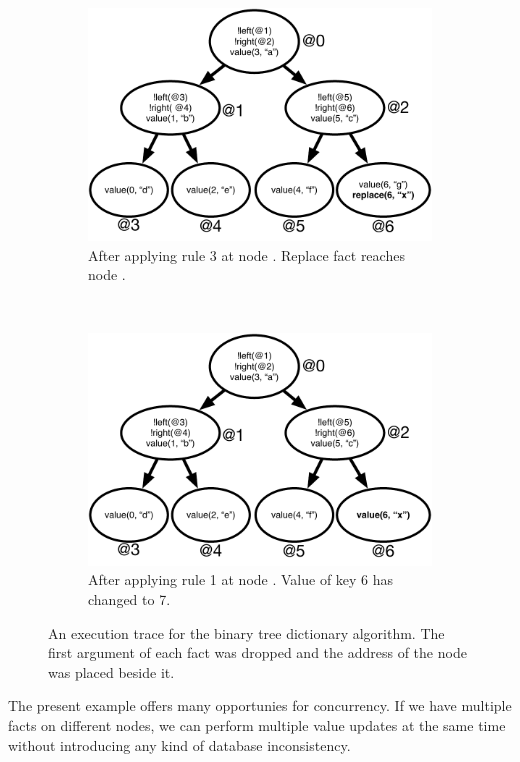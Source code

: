 \begin{figure}[h]
        \begin{subfigure}[b]{0.5\textwidth}
                \includegraphics[width=\textwidth]{figures/btree/btree_trace3}
                \caption{After applying rule 3 at node . Replace fact
                   reaches node .}
                \label{fig:btree_trace3}
        \end{subfigure}%
        ~
        \begin{subfigure}[b]{0.5\textwidth}
                  \includegraphics[width=\textwidth]{figures/btree/btree_trace4}
                  \caption{After applying rule 1 at node . Value of key 6 has changed to 7.}
                  \label{fig:btree_trace4}
          \end{subfigure}
        \caption{An execution trace for the binary tree dictionary
           algorithm. The first argument of each fact was dropped and the
           address of the node was placed beside it.}\label{fig:btree_trace}
\end{figure}

The present example offers many opportunies for concurrency. If we have multiple
 facts on different nodes, we can perform multiple value updates
at the same time without introducing any kind of database inconsistency.

